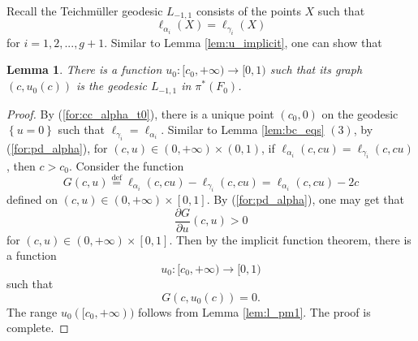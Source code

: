 \documentclass[UTF8]{amsart}
\newtheorem{lemma}[theorem]{Lemma}
\numberwithin{equation}{section}
\theoremstyle{definition}
\theoremstyle{example}
\theoremstyle{remark}
\begin{document}
Recall the Teichm\"uller geodesic $L_{-1,1}$ consists of the points $X$ such that
\[
 \ell_{\alpha_i}(X) = \ell_{\gamma_i}(X)
\]
for $i =1,2,...,g+1$. 
Similar to Lemma \ref{lem:u_implicit}, one can show that
\begin{lemma}
 There is a function $u_0:[c_0, +\infty)\to [0,1)$ such that its graph $(c, u_0(c))$ is the geodesic $L_{-1,1}$ in $\pi^{*}(F_0)$. 
 \label{lem:u0_implicit}
\end{lemma}
\begin{proof}
 By (\ref{for:cc_alpha_t0}), there is a unique point $(c_0,0)$ on the geodesic $\left\{ u=0 \right\} $ such that $\ell_{\gamma_i} = \ell_{\alpha_i}$. 
 Similar to Lemma \ref{lem:bc_eqs} $(3)$, by (\ref{for:pd_alpha}), for $(c,u)\in (0,+\infty) \times (0,1)$, if $\ell_{\alpha_i}(c,cu) = \ell_{\gamma_i}(c,cu)$, then  $c> c_0$. 
 Consider the function
 \[
  G(c,u) \overset{\mathrm{\mathrm{def}}}{=} \ell_{\alpha_i}(c,cu) - \ell_{\gamma_i}(c,cu) = \ell_{\alpha_i}(c,cu) - 2c
 \]
 defined on $(c,u)\in (0,+\infty) \times [0,1]$. 
 By (\ref{for:pd_alpha}), one may get that
 \[
  \frac{\partial G}{\partial u} (c,u) > 0 
 \]
 for $(c,u)\in (0,+\infty) \times [0,1]$. 
 Then by the implicit function theorem, there is a function 
 \[
  u_0: [c_0, +\infty) \to [0,1)
 \]
 such that 
 \[
  G(c, u_0(c)) = 0. 
 \]
 The range $u_0([c_0,+\infty))$ follows from Lemma \ref{lem:l_pm1}. The proof is complete.

\end{proof}
\end{document}
